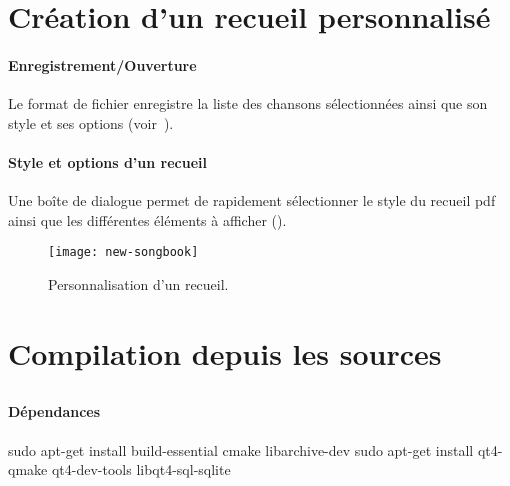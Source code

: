 \section{Création d'un recueil personnalisé}

\paragraph{Enregistrement/Ouverture}
Le format de fichier  enregistre la liste des chansons
sélectionnées ainsi que son style et ses options
(voir~).

\paragraph{Style et options d'un recueil}
Une boîte de dialogue permet de rapidement sélectionner le style du
recueil pdf ainsi que les différentes éléments à afficher
().

\begin{figure}
  \centering
  \texttt{[image: new-songbook]}
  \caption{Personnalisation d'un recueil.}
  \label{fig:new-songbook}
\end{figure}

\section{Compilation depuis les sources}

\subsection{\linux}

\paragraph{Dépendances}

\begin{unix}
  sudo apt-get install build-essential cmake libarchive-dev
  sudo apt-get install qt4-qmake qt4-dev-tools libqt4-sql-sqlite
\end{unix}

